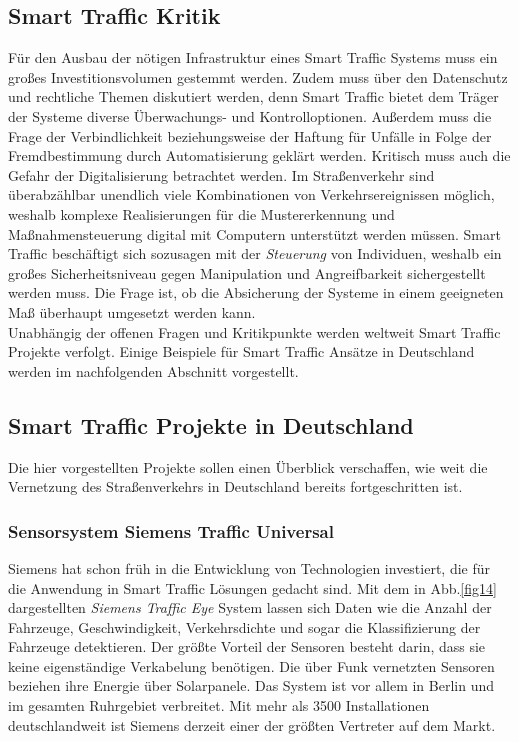 \subsection{Smart Traffic Kritik}

Für den Ausbau der nötigen Infrastruktur eines Smart Traffic Systems muss ein großes Investitionsvolumen gestemmt werden. Zudem muss über den Datenschutz und rechtliche Themen diskutiert werden, denn Smart Traffic bietet dem Träger der Systeme diverse Überwachungs- und Kontrolloptionen. Außerdem muss die Frage der Verbindlichkeit beziehungsweise der Haftung für Unfälle in Folge der Fremdbestimmung durch Automatisierung geklärt werden. Kritisch muss auch die Gefahr der Digitalisierung betrachtet werden. Im Straßenverkehr sind überabzählbar unendlich viele Kombinationen von Verkehrsereignissen möglich, weshalb komplexe Realisierungen für die Mustererkennung und Maßnahmensteuerung digital mit Computern unterstützt werden müssen. Smart Traffic beschäftigt sich sozusagen mit der \emph{Steuerung} von Individuen, weshalb ein großes Sicherheitsniveau gegen Manipulation und Angreifbarkeit sichergestellt werden muss. Die Frage ist, ob die Absicherung der Systeme in einem geeigneten Maß überhaupt umgesetzt werden kann.\\
Unabhängig der offenen Fragen und Kritikpunkte werden weltweit Smart Traffic Projekte verfolgt. Einige Beispiele für Smart Traffic Ansätze in Deutschland werden im nachfolgenden Abschnitt vorgestellt.

\subsection{Smart Traffic Projekte in Deutschland}\label{smartTrafficGermany}
Die hier vorgestellten Projekte sollen einen Überblick verschaffen, wie weit die Vernetzung des Straßenverkehrs in Deutschland bereits fortgeschritten ist.


\subsubsection{Sensorsystem Siemens Traffic Universal}
Siemens hat schon früh in die Entwicklung von Technologien investiert, die für die Anwendung in Smart Traffic Lösungen gedacht sind. Mit dem in Abb.\ref{fig14} dargestellten \textit{Siemens Traffic Eye} System lassen sich Daten wie die Anzahl der Fahrzeuge, Geschwindigkeit, Verkehrsdichte und sogar die Klassifizierung der Fahrzeuge detektieren. Der größte Vorteil der Sensoren besteht darin, dass sie keine eigenständige Verkabelung benötigen. Die über Funk vernetzten Sensoren beziehen ihre Energie über Solarpanele. Das System ist vor allem in Berlin und im gesamten Ruhrgebiet verbreitet. Mit mehr als 3500 Installationen deutschlandweit ist Siemens derzeit einer der größten Vertreter auf dem Markt.

